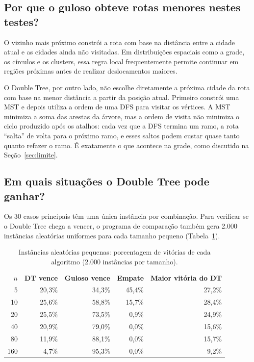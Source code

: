 \documentclass[11pt,a4paper]{article}
\newcommand{\cab}[1]{\leavevmode\color{white}\bfseries #1}
\newcommand{\fioCabecalho}{\arrayrulecolor{tabFio}\specialrule{1.2pt}{0pt}{0pt}\arrayrulecolor{eachTeal}}
\renewcommand{\_}{\underscoreoriginal\allowbreak}
\begin{document}
\subsection{Por que o guloso obteve rotas menores nestes testes?}

O vizinho mais próximo constrói a rota com base na distância entre a
cidade atual e as cidades ainda não visitadas. Em distribuições
espaciais como a grade, os círculos e os clusters, essa regra local
frequentemente permite continuar em regiões próximas antes de realizar
deslocamentos maiores.

O Double Tree, por outro lado, não escolhe diretamente a próxima cidade
da rota com base na menor distância a partir da posição atual. Primeiro
constrói uma MST e depois utiliza a ordem de uma DFS para visitar os
vértices. A MST minimiza a soma das arestas da árvore, mas a ordem de
visita não minimiza o ciclo produzido após os atalhos: cada vez que a
DFS termina um ramo, a rota ``salta'' de volta para o próximo ramo, e
esses saltos podem custar quase tanto quanto refazer o ramo. É
exatamente o que acontece na grade, como discutido na
Seção~\ref{sec:limite}.

\subsection{Em quais situações o Double Tree pode ganhar?}
\label{sec:dtvence}

Os 30 casos principais têm uma única instância por combinação. Para
verificar se o Double Tree chega a vencer, o programa de comparação
também gera 2.000 instâncias aleatórias uniformes para cada tamanho
pequeno (Tabela~\ref{tab:pequenas}).

\begin{table}[H]
\centering
\caption{Instâncias aleatórias pequenas: porcentagem de vitórias de cada algoritmo (2.000 instâncias por tamanho).}
\label{tab:pequenas}
\begin{tabular}{r r r r r}
\toprule
\rowcolor{tabCabecalho}
\cab{$n$} & \cab{DT vence} & \cab{Guloso vence} & \cab{Empate} & \cab{Maior vitória do DT}\\
\fioCabecalho
5 & 20{,}3\% & 34{,}3\% & 45{,}4\% & 27{,}2\% \\
10 & 25{,}6\% & 58{,}8\% & 15{,}7\% & 28{,}4\% \\
20 & 25{,}5\% & 73{,}5\% & 0{,}9\% & 24{,}9\% \\
40 & 20{,}9\% & 79{,}0\% & 0{,}0\% & 15{,}6\% \\
80 & 11{,}9\% & 88{,}1\% & 0{,}0\% & 15{,}7\% \\
160 & 4{,}7\% & 95{,}3\% & 0{,}0\% & 9{,}2\% \\
\bottomrule
\end{tabular}
\end{table}
\end{document}
